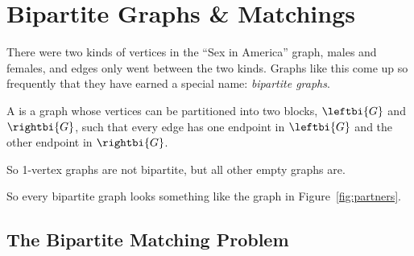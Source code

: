 \begin{problems}
\practiceproblems
{}

\classproblems
{}

\homeworkproblems
{}


\end{problems}


\section{Bipartite Graphs \& Matchings}\label{bipartitesec}


There were two kinds of vertices in the ``Sex in America'' graph,
males and females, and edges only went between the two kinds.  Graphs
like this come up so frequently that they have earned a special
name: \emph{bipartite graphs}.

\begin{definition}
  A   is a graph whose
  vertices can be partitioned into two blocks, $\leftbi{G}$ and
  $\rightbi{G}$, such that every edge has one endpoint in $\leftbi{G}$
  and the other endpoint in $\rightbi{G}$.
\end{definition}

\begin{editingnotes}
So 1-vertex graphs are not bipartite, but all other empty graphs are.
\end{editingnotes}

So every bipartite graph looks something like the graph in
Figure~\ref{fig:partners}.

\subsection{The Bipartite Matching Problem}

